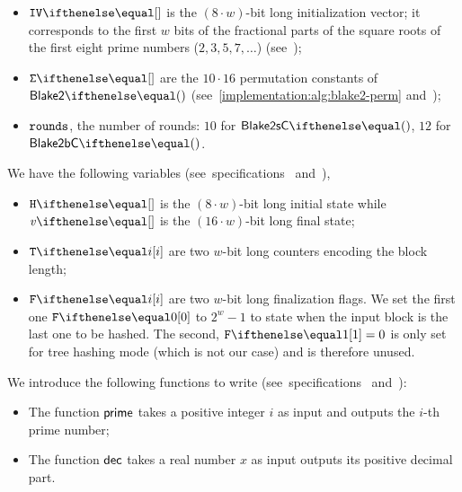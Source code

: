 \begin{itemize}
    \item $\blakeIV{}$ is the $(8 \cdot w)$-bit long initialization vector; it corresponds to the first $w$ bits of the fractional parts of the square roots of the first eight prime numbers ($2, 3, 5, 7, \ldots$) (see~\cite[Section 2.6]{blakecompietf});
    \item $\blakePermutation{}$ are the $10 \cdot 16$ permutation constants of $\blake{2}{}$ (see~\cref{implementation:alg:blake2-perm} and~\cite[Section 2.7]{blakecompietf});
    \item $\mathtt{rounds}$, the number of rounds: $10$ for $\blake{2sC}{}$, $12$ for $\blake{2bC}{}$.
  \end{itemize}
  We have the following variables (see~specifications~\cite{aumasson2013blake2} and~\cite[Section 2.2]{blakecompietf}),
  \begin{itemize}
    \item $\blakeInitState{}$ is the $(8 \cdot w)$-bit long initial state while $\blakeState{}$ is the $(16 \cdot w)$-bit long final state;
    \item $\blakeDigestLength{i}$ are two $w$-bit long counters encoding the block length;
    \item $\blakeFlag{i}$ are two $w$-bit long finalization flags. We set the first one $\blakeFlag{0}$ to $2^w-1$ to state when the input block is the last one to be hashed. The second, $\blakeFlag{1}=0$ is only set for tree hashing mode (which is not our case) and is therefore unused.
\end{itemize}
We introduce the following functions to write  (see~specifications~\cite{aumasson2013blake2} and~\cite[Section 2.6]{blakecompietf}):
\begin{itemize}
  \item The function $\mathsf{prime}$ takes a positive integer $i$ as input and outputs the $i$-th prime number;
  \item The function $\mathsf{dec}$ takes a real number $x$ as input outputs its positive decimal part.
\end{itemize}

